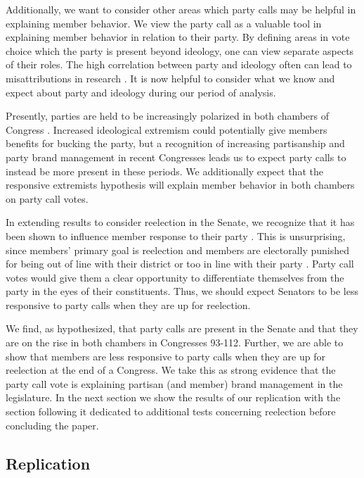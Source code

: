 \documentclass[12pt]{article}
\begin{document}
Additionally, we want to consider other areas which party calls may be helpful in explaining member behavior. We view the party call as a valuable tool in explaining member behavior in relation to their party. By defining areas in vote choice which the party is present beyond ideology, one can view separate aspects of their roles. The high correlation between party and ideology often can lead to misattributions in research \cite{Krehbiel:1993, Lee:2009}. It is now helpful to consider what we know and expect about party and ideology during our period of analysis.

Presently, parties are held to be increasingly polarized in both chambers of Congress \cite{Lee:2009, Lee:2016, Theriault:2013, Smith:2014}. Increased ideological extremism could potentially give members benefits for bucking the party, but a recognition of increasing partisanship and party brand management in recent Congresses \cite{Lee:2009, Lee:2016} leads us to expect party calls to instead  be more present in these periods. We additionally expect that the responsive extremists hypothesis will explain member behavior in both chambers on party call votes.

In extending results to consider reelection in the Senate, we recognize that it has been shown to influence member response to their party \cite{Levitt:1996}. This is unsurprising, since members' primary goal is reelection \cite{Mayhew:1974} and members are electorally punished for being out of line with their district or too in line with their party \cite{Canes-Wrone:2002, Carson:2010}. Party call votes would give them a clear opportunity to differentiate themselves from the party in the eyes of their constituents. Thus, we should expect Senators to be less responsive to party calls when they are up for reelection.

We find, as hypothesized, that party calls are present in the Senate and that they are on the rise in both chambers in Congresses 93-112. Further, we are able to show that members are less responsive to party calls when they are up for reelection at the end of a Congress. We take this as strong evidence that the party call vote is explaining partisan (and member) brand management in the legislature. In the next section we show the results of our replication with the section following it dedicated to additional tests concerning reelection before concluding the paper.

\subsection*{Replication}
\end{document}
